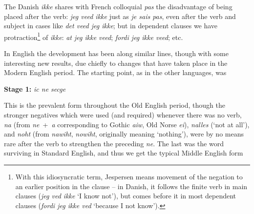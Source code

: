 The Danish \textit{ikke} shares with French colloquial \textit{pas} the disadvantage of being placed after the verb: \textit{jeg veed ikke} just as \textit{je sais pas}, even after the verb and subject in cases like \textit{det veed jeg ikke}; but in dependent clauses we have protraction\footnote{With this idiosyncratic term, Jespersen means movement of the negation to an earlier position in the clause -- in Danish, it follows the finite verb in main clauses (\textit{jeg ved ikke} `I know not'), but comes before it in most dependent clauses (\textit{fordi jeg ikke ved} `because I not know'). \eds} of \textit{ikke}: \textit{at jeg ikke veed}; \textit{fordi jeg ikke veed}; etc.

\bigskip
In English the development has been along similar lines, though with some interesting new results, due chiefly to changes that have taken place in the Modern English period. The starting point, as in the other languages, was

\bigskip

\textbf{Stage 1:} \textit{ic ne secge}

\bigskip

This is the prevalent form throughout the Old English period, though the stronger negatives which were used (and required) whenever there was no verb, \textit{na} (from \textit{ne}~+~\textit{a} corresponding to Gothic \textit{aiw}, Old Norse \textit{ei}), \textit{nalles} (`not at all'), and \textit{noht} (from \textit{nawiht}, \textit{nowiht}, originally meaning `nothing'), were by no means rare after the verb to strengthen the preceding \textit{ne}. The last was the word surviving in Standard English, and thus we get the typical Middle English form

